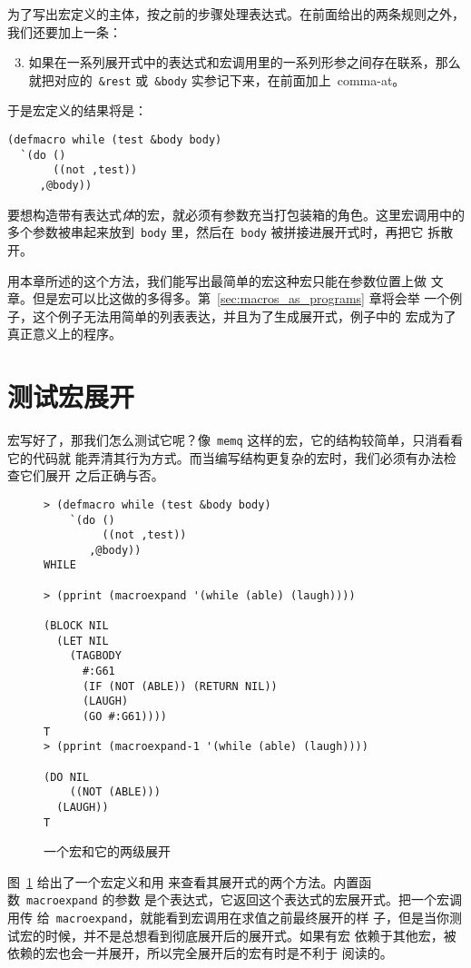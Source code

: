 为了写出宏定义的主体，按之前的步骤处理表达式。在前面给出的两条规则之外，
我们还要加上一条：
\begin{enumerate}
\setcounter{enumi}{2}
\item 如果在一系列展开式中的表达式和宏调用里的一系列形参之间存在联系，那么
  就把对应的~\verb|&rest| 或~\verb|&body| 实参记下来，在前面加上~comma-at。
\end{enumerate}
于是宏定义的结果将是：\label{macro:while}
\begin{lstlisting}
(defmacro while (test &body body)
  `(do ()
       ((not ,test))
     ,@body))
\end{lstlisting}
要想构造带有表达式\emph{体}的宏，就必须有参数充当打包装箱的角色。这里宏调用中的
多个参数被串起来放到~\verb|body| 里，然后在~\verb|body| 被拼接进展开式时，再把它
拆散开。

用本章所述的这个方法，我们能写出最简单的宏\pozhehao{}这种宏只能在参数位置上做
文章。但是宏可以比这做的多得多。第~\ref{sec:macros_as_programs} 章将会举
一个例子，这个例子无法用简单的\bq{}列表表达，并且为了生成展开式，例子中的
宏成为了真正意义上的程序。

\section{测试宏展开}
\label{sec:testing333_macroexpansion}

宏写好了，那我们怎么测试它呢？像~\verb|memq| 这样的宏，它的结构较简单，只消看看它的代码就
能弄清其行为方式。而当编写结构更复杂的宏时，我们必须有办法检查它们展开
之后正确与否。

\begin{figure}
\begin{lstlisting}
> (defmacro while (test &body body)
    `(do ()
         ((not ,test))
       ,@body))
WHILE

> (pprint (macroexpand '(while (able) (laugh))))

(BLOCK NIL
  (LET NIL
    (TAGBODY
      #:G61
      (IF (NOT (ABLE)) (RETURN NIL))
      (LAUGH)
      (GO #:G61))))
T
> (pprint (macroexpand-1 '(while (able) (laugh))))

(DO NIL
    ((NOT (ABLE)))
  (LAUGH))
T
\end{lstlisting}
\caption{\label{fig:a_macro_and_two_depths_of_expansion}一个宏和它的两级展开}
\end{figure}

图~\ref{fig:a_macro_and_two_depths_of_expansion} 给出了一个宏定义和用
来查看其展开式的两个方法。内置函
数~\verb|macroexpand| 的参数
是个表达式，它返回这个表达式的宏展开式。把一个宏调用传
给~\verb|macroexpand|，就能看到宏调用在求值之前最终展开的样
子，但是当你测试宏的时候，并不是总想看到彻底展开后的展开式。如果有宏
依赖于其他宏，被依赖的宏也会一并展开，所以完全展开后的宏有时是不利于
阅读的。

